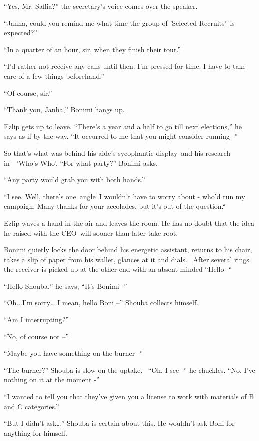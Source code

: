 \documentclass[twoside,11pt]{book}
\begin{document}
``Yes, Mr. Saffia?'' the secretary's voice comes over the speaker.

``Janha, could you remind me what time the group of {}'Selected Recruits{}'{\ }is
expected?''

``In a quarter of an hour, sir, when they finish their tour.'' 

``I'd rather not receive any calls until then. I'm pressed for time. I have to take care of a few things
beforehand.'' 

``Of course, sir.'' 

``Thank you, Janha,'' Bonimi hangs up. 

Ezlip gets up to leave. ``There's a year and a half to go till next elections,'' he says as if
by the way. ``It occurred to me that you might consider running -''

So that's what was behind his aide's sycophantic display{\ }and his research in\ \ {}'Who's Who{}'.
``For what party?'' Bonimi asks.

``Any party would grab you with both hands.'' 

``I see. Well, there's one\ angle\ I wouldn't have to worry about - who'd run my campaign. Many thanks for
your accolades, but it's out of the question.``\ 

Ezlip waves a hand in the air and leaves the room. He has no doubt that the idea he raised with the CEO~will sooner than
later take root{.\ }

Bonimi quietly locks the door behind his energetic assistant, returns to his chair, takes a slip of paper from his
wallet, glances at it and dials.~ After several rings the receiver is picked up at the other end with an absent-minded
``Hello -``\ 

``Hello Shouba,'' he says, ``It's Bonimi -'' 

``Oh...I'm sorry{\dots} I mean, hello Boni --'' Shouba collects himself.

``Am I interrupting?'' 

``No, of course not --'' 

``Maybe you have something on the burner -'' 

``The burner?'' Shouba is slow on the uptake. ~``Oh, I see -'' he
chuckles. ``No, I've nothing on it at the moment -'' 

``I wanted to tell you that they've given you a license to work with materials of B and C
categories.'' 

``But I didn't ask{\dots}'' Shouba is certain about this. He wouldn't ask Boni for anything
for himself. 
\end{document}
